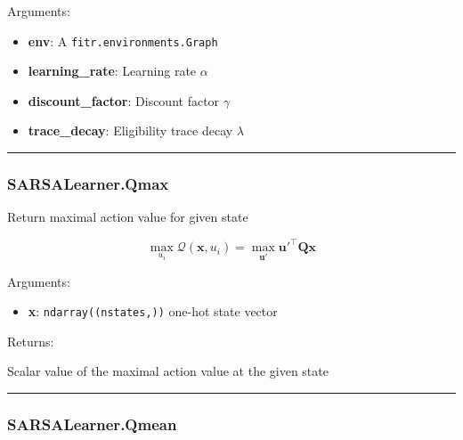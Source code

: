 Arguments:

\begin{itemize}
\tightlist
\item
  \textbf{env}: A \texttt{fitr.environments.Graph}
\item
  \textbf{learning\_rate}: Learning rate \(\alpha\)
\item
  \textbf{discount\_factor}: Discount factor \(\gamma\)
\item
  \textbf{trace\_decay}: Eligibility trace decay \(\lambda\)
\end{itemize}

\begin{center}\rule{0.5\linewidth}{\linethickness}\end{center}

\subsubsection{SARSALearner.Qmax}\label{sarsalearner.qmax}

\begin{Shaded}
\begin{Highlighting}[]
\end{Highlighting}
\end{Shaded}

Return maximal action value for given state

\[
\max_{u_i}\mathcal Q(\mathbf x, u_i) = \max_{\mathbf u'} \mathbf u'^\top \mathbf Q \mathbf x
\]

Arguments:

\begin{itemize}
\tightlist
\item
  \textbf{x}: \texttt{ndarray((nstates,))} one-hot state vector
\end{itemize}

Returns:

Scalar value of the maximal action value at the given state

\begin{center}\rule{0.5\linewidth}{\linethickness}\end{center}

\subsubsection{SARSALearner.Qmean}\label{sarsalearner.qmean}

\begin{Shaded}
\begin{Highlighting}[]
\end{Highlighting}
\end{Shaded}

